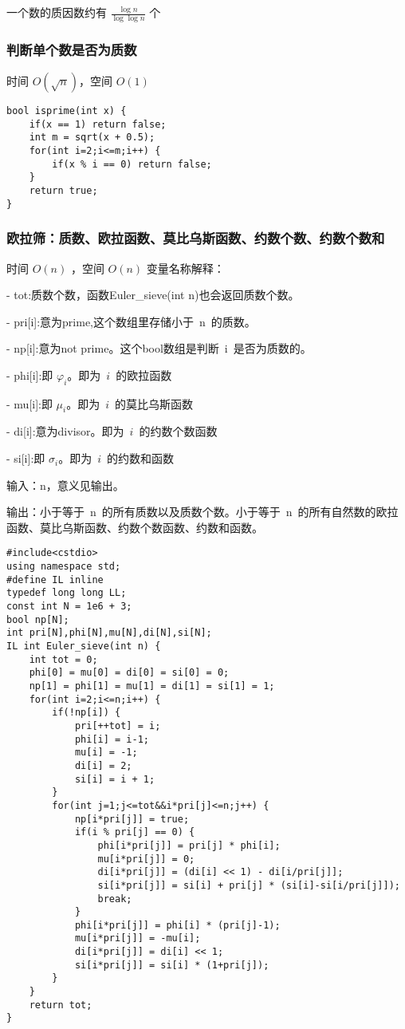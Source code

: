 \documentclass[UTF8]{ctexart}
\begin{document}
一个数的质因数约有 $\frac{\log n}{\log \log n}$ 个

\subsubsection{判断单个数是否为质数}
时间 $O(\sqrt n)$，空间 $O(1)$

\begin{framed}
\begin{lstlisting}
bool isprime(int x) {
    if(x == 1) return false;
    int m = sqrt(x + 0.5);
    for(int i=2;i<=m;i++) {
        if(x % i == 0) return false;
    }
    return true;
}
\end{lstlisting}
\end{framed}

\subsubsection{欧拉筛：质数、欧拉函数、莫比乌斯函数、约数个数、约数个数和}
时间 $O(n)$ ，空间 $O(n)$
变量名称解释：

- tot:质数个数，函数Euler\_sieve(int n)也会返回质数个数。

- pri[i]:意为prime,这个数组里存储小于\ n\ 的质数。

- np[i]:意为not prime。这个bool数组是判断\ i\ 是否为质数的。

- phi[i]:即 $\varphi_i$。即为\ $i$\ 的欧拉函数

- mu[i]:即 $\mu_i$。即为\ $i$\ 的莫比乌斯函数

- di[i]:意为divisor。即为\ $i$\ 的约数个数函数

- si[i]:即 $\sigma_i$。即为\ $i$\ 的约数和函数

输入：n，意义见输出。

输出：小于等于\ n\ 的所有质数以及质数个数。小于等于\ n\ 的所有自然数的欧拉函数、莫比乌斯函数、约数个数函数、约数和函数。
\begin{framed}
\begin{lstlisting}
#include<cstdio>
using namespace std;
#define IL inline 
typedef long long LL;
const int N = 1e6 + 3;
bool np[N];
int pri[N],phi[N],mu[N],di[N],si[N];
IL int Euler_sieve(int n) {
    int tot = 0;
    phi[0] = mu[0] = di[0] = si[0] = 0;
    np[1] = phi[1] = mu[1] = di[1] = si[1] = 1;
    for(int i=2;i<=n;i++) {
        if(!np[i]) {
            pri[++tot] = i;
            phi[i] = i-1;
            mu[i] = -1;
            di[i] = 2;
            si[i] = i + 1;
        }
        for(int j=1;j<=tot&&i*pri[j]<=n;j++) {
            np[i*pri[j]] = true;
            if(i % pri[j] == 0) {
                phi[i*pri[j]] = pri[j] * phi[i];
                mu[i*pri[j]] = 0;
                di[i*pri[j]] = (di[i] << 1) - di[i/pri[j]];
                si[i*pri[j]] = si[i] + pri[j] * (si[i]-si[i/pri[j]]);
                break;
            }
            phi[i*pri[j]] = phi[i] * (pri[j]-1);
            mu[i*pri[j]] = -mu[i];
            di[i*pri[j]] = di[i] << 1;
            si[i*pri[j]] = si[i] * (1+pri[j]);
        }
    }
    return tot;
}
\end{lstlisting}
\end{framed}
\end{document}
